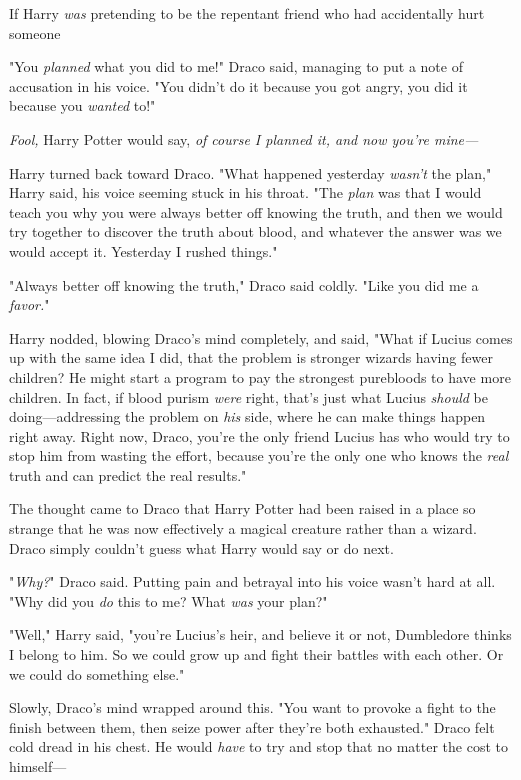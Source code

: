 If Harry \emph{was} pretending to be the repentant friend who had accidentally
hurt someone{\el}

"You \emph{planned} what you did to me!" Draco said, managing to put a note of
accusation in his voice. "You didn't do it because you got angry, you did it
because you \emph{wanted} to!"

\emph{Fool,} Harry Potter would say, \emph{of course I planned it, and now
you're mine---}

Harry turned back toward Draco. "What happened yesterday \emph{wasn't} the
plan," Harry said, his voice seeming stuck in his throat. "The \emph{plan} was
that I would teach you why you were always better off knowing the truth, and
then we would try together to discover the truth about blood, and whatever the
answer was we would accept it. Yesterday I{\el} rushed things."

"Always better off knowing the truth," Draco said coldly. "Like you did me a
\emph{favor.}"

Harry nodded, blowing Draco's mind completely, and said, "What if Lucius comes
up with the same idea I did, that the problem is stronger wizards having fewer
children? He might start a program to pay the strongest purebloods to have more
children. In fact, if blood purism \emph{were} right, that's just what Lucius
\emph{should} be doing---addressing the problem on \emph{his} side, where he
can make things happen right away. Right now, Draco, you're the only friend
Lucius has who would try to stop him from wasting the effort, because you're
the only one who knows the \emph{real} truth and can predict the real results."

The thought came to Draco that Harry Potter had been raised in a place so
strange that he was now effectively a magical creature rather than a wizard.
Draco simply couldn't guess what Harry would say or do next.

"\emph{Why?}" Draco said. Putting pain and betrayal into his voice wasn't hard
at all. "Why did you \emph{do} this to me? What \emph{was} your plan?"

"Well," Harry said, "you're Lucius's heir, and believe it or not, Dumbledore
thinks I belong to him. So we could grow up and fight their battles with each
other. Or we could do something else."

Slowly, Draco's mind wrapped around this. "You want to provoke a fight to the
finish between them, then seize power after they're both exhausted." Draco felt
cold dread in his chest. He would \emph{have} to try and stop that no matter
the cost to himself---

